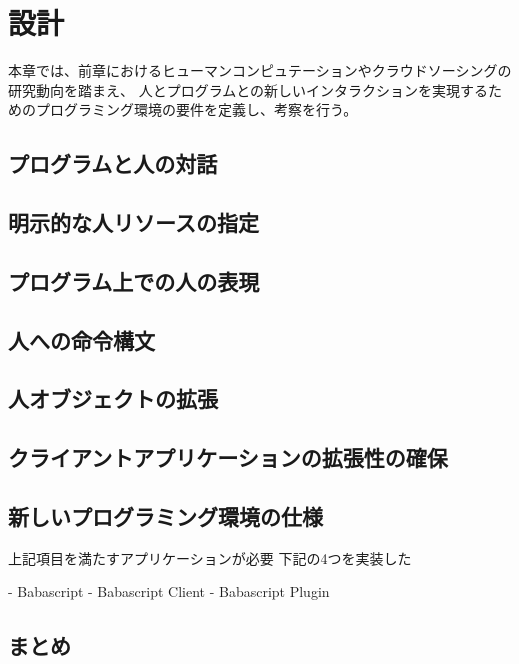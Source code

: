 \chapter{設計}
\label{chap:design}

本章では、前章におけるヒューマンコンピュテーションやクラウドソーシングの研究動向を踏まえ、
人とプログラムとの新しいインタラクションを実現するためのプログラミング環境の要件を定義し、考察を行う。

\section{プログラムと人の対話}

\section{明示的な人リソースの指定}

\section{プログラム上での人の表現}

\section{人への命令構文}

\section{人オブジェクトの拡張}

\section{クライアントアプリケーションの拡張性の確保}

\section{新しいプログラミング環境の仕様}

上記項目を満たすアプリケーションが必要
下記の4つを実装した

- Babascript
- Babascript Client
- Babascript Plugin

\section{まとめ}
